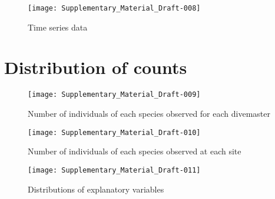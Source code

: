 \documentclass[a4paper]{article}
\begin{document}

\begin{figure}[h!]
\centering
\texttt{[image: Supplementary\_Material\_Draft-008]}
\caption{Time series data}
\end{figure}





\clearpage



\section{Distribution of counts}


\begin{figure}[h!]
\centering
\texttt{[image: Supplementary\_Material\_Draft-009]}
\caption{Number of individuals of each species observed for each divemaster}
\end{figure}



\begin{figure}[h!]
\centering
\texttt{[image: Supplementary\_Material\_Draft-010]}
\caption{Number of individuals of each species observed at each site}
\end{figure}



\clearpage


\begin{figure}[h!]
\centering
\texttt{[image: Supplementary\_Material\_Draft-011]}
\caption{Distributions of explanatory variables}
\end{figure}
\end{document}
